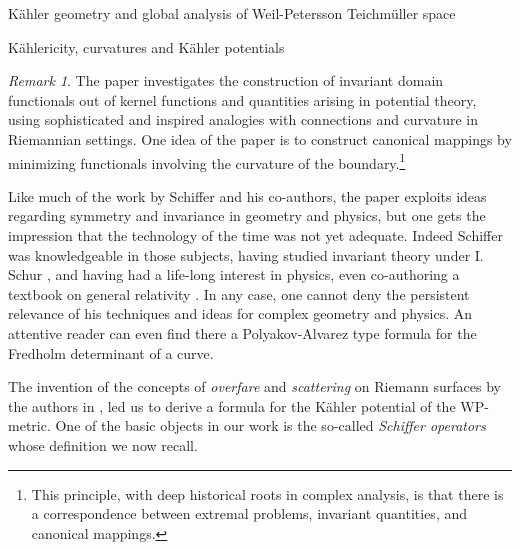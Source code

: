 \documentclass[12pt]{amsart}
\theoremstyle{plain}
\theoremstyle{definition}
\theoremstyle{remark}
\newtheorem{remark}[theorem]{Remark}
\numberwithin{equation}{section} %
\numberwithin{figure}{section} %
\begin{document}
\begin{section}{K\"ahler geometry and global analysis of Weil-Petersson Teichm\"uller space}
\begin{subsection}{K\"ahlericity, curvatures and K\"ahler potentials}
{\begin{remark}
 The paper investigates the construction of invariant domain functionals out of kernel functions and quantities arising in potential theory, using sophisticated and inspired analogies with connections and curvature in Riemannian settings. One idea of the paper is to construct canonical mappings by minimizing functionals involving the curvature of the boundary.\footnote{This principle, with deep historical roots in complex analysis, is that there is a correspondence between extremal problems, invariant quantities, and canonical mappings.} 
 
 Like much of the work by Schiffer and his co-authors, the paper \cite{Schiffer_Hawley_connections} exploits ideas regarding symmetry and invariance in geometry and physics, but one gets the impression that the technology of the time was not yet adequate. Indeed Schiffer was knowledgeable in those subjects, having studied invariant theory under I. Schur \cite{Schiffer_Schur}, and having had a life-long interest in physics, even co-authoring a textbook on general relativity \cite{Adler_et_al_relativity}. In any case, one cannot deny the persistent relevance of his techniques and ideas for complex geometry and physics.  {An attentive reader can even find there a Polyakov-Alvarez type formula for the Fredholm determinant of a curve.} 
\end{remark}}

The invention of the concepts of \emph{overfare} and \emph{scattering} on Riemann surfaces by the authors in \cite{Schippers_Staubach_scattering}, led us to derive a formula for the K\"ahler potential of the WP-metric.
One of the basic objects in our work is the so-called {\it Schiffer operators} whose definition we now recall.


\end{subsection}
\end{section}
\end{document}
